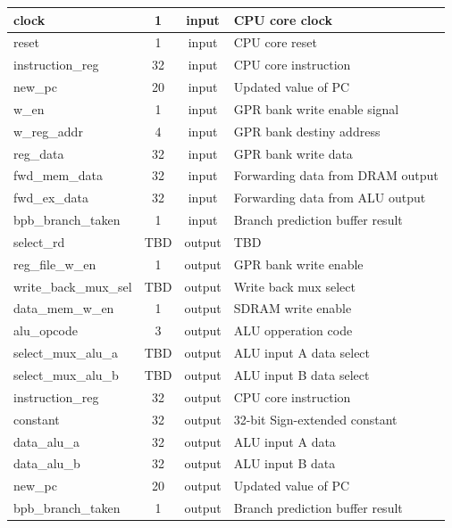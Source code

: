 \documentclass{article}
\begin{document}
\begin{center}
\begin{longtable}[pos]{| l | c | c | m{7cm} |}
      	clock 		          & 1 	& input 	& CPU core clock  	\\ \hline
      	reset 		          & 1	  & input		& CPU core reset  	\\ \hline
      	instruction\_reg    & 32	& input 	& CPU core instruction \\ \hline
      	new\_pc 	          & 20	& input 	& Updated value of PC \\ \hline
      	w\_en 	            & 1	  & input 	& GPR bank write enable signal \\ \hline
      	w\_reg\_addr 	      & 4	  & input 	& GPR bank destiny address  \\ \hline
      	reg\_data 	        & 32	& input 	& GPR bank write data  \\ \hline
      	fwd\_mem\_data 	    & 32	& input	  & Forwarding data from DRAM output \\ \hline
      	fwd\_ex\_data 	    & 32	& input 	& Forwarding data from ALU output  \\ \hline
      	bpb\_branch\_taken  & 1   & input   & Branch prediction buffer result \\ \hline
        select\_rd 	        & TBD & output 	& TBD  \\ \hline
        reg\_file\_w\_en    & 1   & output  & GPR bank write enable \\ \hline
        write\_back\_mux\_sel & TBD & output & Write back mux select \\ \hline
        data\_mem\_w\_en    & 1  & output  & SDRAM write enable  \\ \hline
        alu\_opcode         & 3  & output  & ALU opperation code  \\ \hline
        select\_mux\_alu\_a & TBD& output  & ALU input A data select  \\ \hline
        select\_mux\_alu\_b & TBD& output  & ALU input B data select \\ \hline
        instruction\_reg    & 32 & output  & CPU core instruction  \\ \hline
        constant            & 32 & output  & 32-bit Sign-extended constant  \\ \hline
        data\_alu\_a        & 32 & output  & ALU input A data  \\ \hline
        data\_alu\_b        & 32 & output  & ALU input B data  \\ \hline
        new\_pc             & 20 & output  & Updated value of PC  \\ \hline
        bpb\_branch\_taken  & 1   & output   & Branch prediction buffer result \\

      \end{longtable}
    \end{center}
    
\end{document}
